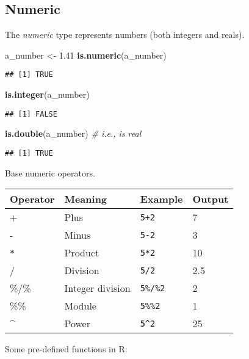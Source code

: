 \documentclass[
]{book}
\newenvironment{Shaded}{\begin{snugshade}}{\end{snugshade}}
\newcommand{\CommentTok}[1]{\textcolor[rgb]{0.56,0.35,0.01}{\textit{#1}}}
\newcommand{\FloatTok}[1]{\textcolor[rgb]{0.00,0.00,0.81}{#1}}
\newcommand{\KeywordTok}[1]{\textcolor[rgb]{0.13,0.29,0.53}{\textbf{#1}}}
\newcommand{\NormalTok}[1]{#1}
\newcommand{\StringTok}[1]{\textcolor[rgb]{0.31,0.60,0.02}{#1}}
\begin{document}
\hypertarget{numeric}{%
\subsection{Numeric}\label{numeric}}

The \emph{numeric} type represents numbers (both integers and reals).

\begin{Shaded}
\begin{Highlighting}[]
\NormalTok{a_number <-}\StringTok{ }\FloatTok{1.41}
\KeywordTok{is.numeric}\NormalTok{(a_number)}
\end{Highlighting}
\end{Shaded}

\begin{verbatim}
## [1] TRUE
\end{verbatim}

\begin{Shaded}
\begin{Highlighting}[]
\KeywordTok{is.integer}\NormalTok{(a_number)}
\end{Highlighting}
\end{Shaded}

\begin{verbatim}
## [1] FALSE
\end{verbatim}

\begin{Shaded}
\begin{Highlighting}[]
\KeywordTok{is.double}\NormalTok{(a_number) }\CommentTok{# i.e., is real}
\end{Highlighting}
\end{Shaded}

\begin{verbatim}
## [1] TRUE
\end{verbatim}

Base numeric operators.

\begin{longtable}[]{@{}llll@{}}
\toprule
Operator & Meaning & Example & Output\tabularnewline
\midrule
\endhead
+ & Plus & \texttt{5+2} & 7\tabularnewline
- & Minus & \texttt{5-2} & 3\tabularnewline
\texttt{*} & Product & \texttt{5*2} & 10\tabularnewline
/ & Division & \texttt{5/2} & 2.5\tabularnewline
\%/\% & Integer division & \texttt{5\%/\%2} & 2\tabularnewline
\%\% & Module & \texttt{5\%\%2} & 1\tabularnewline
\^{} & Power & \texttt{5\^{}2} & 25\tabularnewline
\bottomrule
\end{longtable}

Some pre-defined functions in R:
\end{document}
